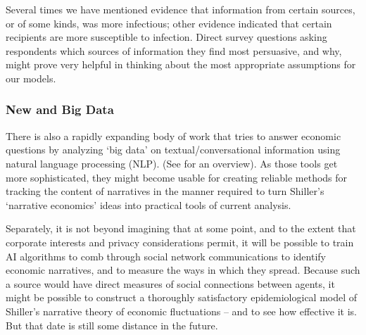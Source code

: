 Several times we have mentioned evidence that information from certain sources, or of some kinds, was more infectious;  other evidence indicated that certain recipients are more susceptible to infection.  %
Direct survey questions asking respondents which sources of information they find most persuasive, and why, might prove very helpful in thinking about the most appropriate assumptions for our models.%

\subsubsection{New and Big Data}
There is also a rapidly expanding body of work that tries to answer economic questions by analyzing `big data' on textual/conversational information using natural language processing (NLP).  (See \cite{gentzkow2019text} for an overview).  As those tools get more sophisticated, they might become usable for creating reliable methods for tracking the content of narratives in the manner required to turn Shiller's `narrative economics' ideas into practical tools of current analysis.

Separately, it is not beyond imagining that at some point, and to the extent that corporate interests and privacy considerations permit, it will be possible to train AI algorithms to comb through social network communications to identify economic narratives, and to measure the ways in which they spread.  Because such a source would have direct measures of social connections between agents, it might be possible to construct a thoroughly satisfactory epidemiological model of Shiller's narrative theory of economic fluctuations -- and to see how effective it is.  But that date is still some distance in the future.


